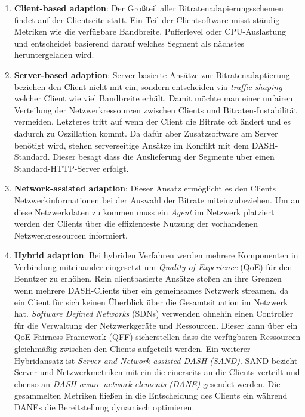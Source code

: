 \documentclass[paper = a4, fontsize = 12pt, parskip = half]{scrartcl} %
\begin{document}
\begin{enumerate}
	\item \textbf{Client-based adaption}: Der Großteil aller Bitratenadapierungsschemen findet auf der Clientseite statt. Ein Teil der Clientsoftware misst ständig Metriken wie die verfügbare Bandbreite, Pufferlevel oder CPU-Auslastung und entscheidet basierend darauf welches Segment als nächstes heruntergeladen wird. 
	\item \textbf{Server-based adaption}: Server-basierte Ansätze zur Bitratenadaptierung beziehen den Client nicht mit ein, sondern entscheiden via \textit{traffic-shaping} welcher Client wie viel Bandbreite erhält. Damit möchte man einer unfairen Verteilung der Netzwerkressourcen zwischen Clients und Bitraten-Instabilität vermeiden. Letzteres tritt auf wenn der Client die Bitrate oft ändert und es dadurch zu Oszillation kommt. Da dafür aber Zusatzsoftware am Server benötigt wird, stehen serverseitige Ansätze im Konflikt mit dem DASH-Standard. Dieser besagt dass die Auslieferung der Segmente über einen Standard-HTTP-Server erfolgt.
	\item \textbf{Network-assisted adaption}: Dieser Ansatz ermöglicht es den Clients Netzwerkinformationen bei der Auswahl der Bitrate miteinzubeziehen. Um an diese Netzwerkdaten zu kommen muss ein \textit{Agent} im Netzwerk platziert werden der Clients über die effizienteste Nutzung der vorhandenen Netzwerkressourcen informiert.
	\item \textbf{Hybrid adaption}: Bei hybriden Verfahren werden mehrere Komponenten in Verbindung miteinander eingesetzt um \textit{Quality of Experience} (QoE) für den Benutzer zu erhöhen. Rein clientbasierte Ansätze stoßen an ihre Grenzen wenn mehrere DASH-Clients über ein gemeinsames Netzwerk streamen, da ein Client für sich keinen Überblick über die Gesamtsituation im Netzwerk hat. \textit{Software Defined Networks} (SDNs) verwenden ohnehin einen Controller für die Verwaltung der Netzwerkgeräte und Ressourcen. Dieser kann über ein QoE-Fairness-Framework (QFF) sicherstellen dass die verfügbaren Ressourcen gleichmäßig zwischen den Clients aufgeteilt werden. Ein weiterer Hybridansatz ist \textit{Server and Network-assisted DASH (SAND)}. SAND bezieht Server und Netzwerkmetriken mit ein die einerseits an die Clients verteilt und ebenso an \textit{DASH aware network elements (DANE)} gesendet werden. Die gesammelten Metriken fließen in die Entscheidung des Clients ein während DANEs die Bereitstellung dynamisch optimieren.
\end{enumerate}
\end{document}
